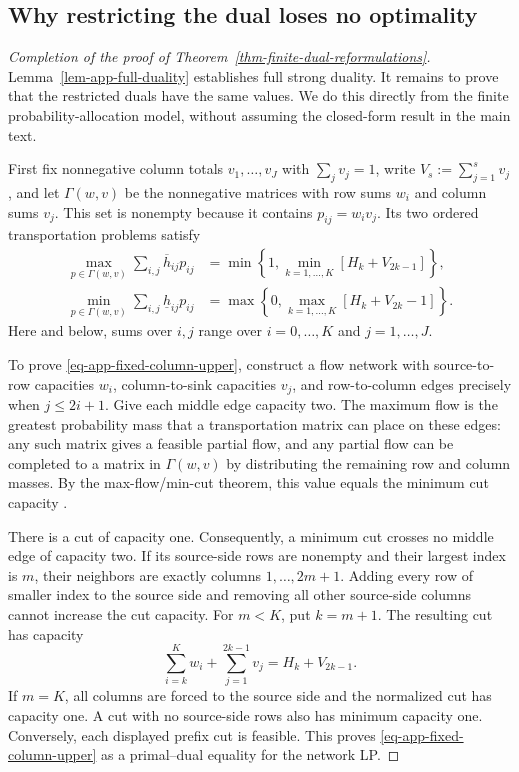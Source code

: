 \subsection{Why restricting the dual loses no optimality}
\label{app-lossless-restriction}

\begin{proof}[Completion of the proof of Theorem~\ref{thm-finite-dual-reformulations}]
  Lemma~\ref{lem-app-full-duality} establishes full strong duality. It remains to prove that the restricted duals have the same values. We do this directly from the finite probability-allocation model, without assuming the closed-form result in the main text.

  First fix nonnegative column totals $v_1,\ldots,v_J$ with $\sum_jv_j=1$, write
  $V_s:=\sum_{j=1}^s v_j$, and let $\Gamma(w,v)$ be the nonnegative matrices with row sums $w_i$ and column sums $v_j$. This set is nonempty because it contains $p_{ij}=w_iv_j$. Its two ordered transportation problems satisfy
  \begin{align}
    \max_{p\in\Gamma(w,v)}\sum_{i,j}\overline h_{ij}p_{ij}
    &=\min\left\{1,\min_{k=1,\ldots,K}\left[H_k+V_{2k-1}\right]\right\},
    \label{eq-app-fixed-column-upper}\\
    \min_{p\in\Gamma(w,v)}\sum_{i,j}\underline h_{ij}p_{ij}
    &=\max\left\{0,\max_{k=1,\ldots,K}\left[H_k+V_{2k}-1\right]\right\}.
    \label{eq-app-fixed-column-lower}
  \end{align}
  Here and below, sums over $i,j$ range over $i=0,\ldots,K$ and $j=1,\ldots,J$.

  To prove \eqref{eq-app-fixed-column-upper}, construct a flow network with source-to-row capacities $w_i$, column-to-sink capacities $v_j$, and row-to-column edges precisely when $j\le2i+1$. Give each middle edge capacity two. The maximum flow is the greatest probability mass that a transportation matrix can place on these edges: any such matrix gives a feasible partial flow, and any partial flow can be completed to a matrix in $\Gamma(w,v)$ by distributing the remaining row and column masses. By the max-flow/min-cut theorem, this value equals the minimum cut capacity \citep{F.F56}.

  There is a cut of capacity one. Consequently, a minimum cut crosses no middle edge of capacity two. If its source-side rows are nonempty and their largest index is $m$, their neighbors are exactly columns $1,\ldots,2m+1$. Adding every row of smaller index to the source side and removing all other source-side columns cannot increase the cut capacity. For $m<K$, put $k=m+1$. The resulting cut has capacity
  \[
    \sum_{i=k}^K w_i+\sum_{j=1}^{2k-1}v_j=H_k+V_{2k-1}.
  \]
  If $m=K$, all columns are forced to the source side and the normalized cut has capacity one. A cut with no source-side rows also has minimum capacity one. Conversely, each displayed prefix cut is feasible. This proves \eqref{eq-app-fixed-column-upper} as a primal--dual equality for the network LP.


\end{proof}
